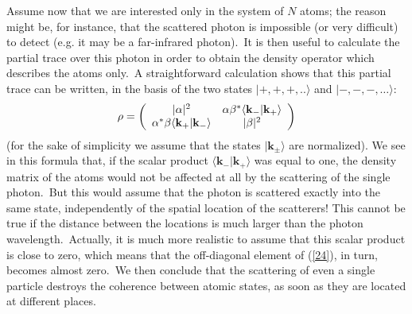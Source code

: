 \documentclass[12pt,onecolumn]{article}%
\begin{document}
Assume now that we are interested only in the system of $N$ atoms; the reason
might be, for instance, that the scattered photon is impossible (or very
difficult) to detect (e.g. it may be a far-infrared photon).\ It is then
useful to calculate the partial trace over this photon in order to obtain the
density operator which describes the atoms only.\ A straightforward
calculation shows that this partial trace can be written, in the basis of the
two states $|+,+,+,..\rangle$ and $|-,-,-,\dots\rangle$:
\begin{equation}
\rho=\left(
\begin{array}
[c]{cc}%
|\alpha|^{2} & \alpha\beta^{\ast}\langle\mathbf{k}_{-}|\mathbf{k}_{+}\rangle\\
\alpha^{\ast}\beta\langle\mathbf{k}_{+}|\mathbf{k}_{-}\rangle & |\beta|^{2}%
\end{array}
\right)  \label{24}%
\end{equation}
(for the sake of simplicity we assume that the states $|\mathbf{k}_{\pm}\rangle$
are normalized). We see in this formula that, if the scalar product
$\langle \mathbf{k}_{-}|\mathbf{k}_{+}\rangle$ was equal to one, the density matrix of
the atoms would not be affected at all by the scattering of the single
photon.\ But this would assume that the photon is scattered exactly into the
same state, independently of the spatial location of the scatterers! This
cannot be true if the distance between the locations is much larger than the
photon wavelength.\ Actually, it is much more realistic to assume that this
scalar product is close to zero, which means that the off-diagonal element of
(\ref{24}), in turn, becomes almost zero.\ We then conclude that the
scattering of even a single particle destroys the coherence between atomic
states, as soon as they are located at different places.
\end{document}
